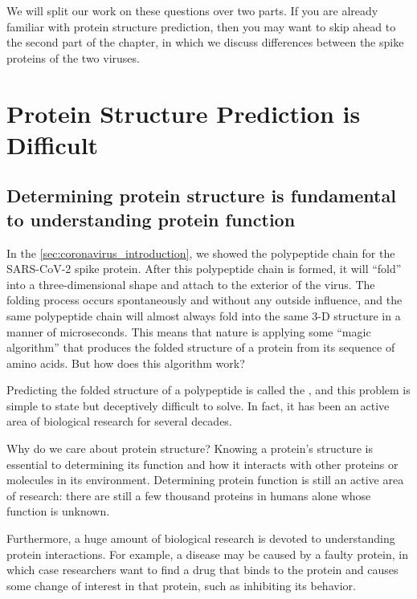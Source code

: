 We will split our work on these questions over two parts. If you are already familiar with protein structure prediction, then you may want to skip ahead to the second part of the chapter, in which we discuss differences between the spike proteins of the two viruses.

\FloatBarrier
{}

\section{Protein Structure Prediction is Difficult}
\label{sec:structure_intro}
\subsection{Determining protein structure is fundamental to understanding protein function}

In the \autoref{sec:coronavirus_introduction}, we showed the polypeptide chain for the SARS-CoV-2 spike protein. After this polypeptide chain is formed, it will ``fold'' into a three-dimensional shape and attach to the exterior of the virus. The folding process occurs spontaneously and without any outside influence, and the same polypeptide chain will almost always fold into the same 3-D structure in a manner of microseconds. This means that nature is applying some ``magic algorithm'' that produces the folded structure of a protein from its sequence of amino acids. But how does this algorithm work?

Predicting the folded structure of a polypeptide is called the , and this problem is simple to state but deceptively difficult to solve. In fact, it has been an active area of biological research for several decades.

Why do we care about protein structure? Knowing a protein's structure is essential to determining its function and how it interacts with other proteins or molecules in its environment. Determining protein function is still an active area of research: there are still a few thousand proteins in humans alone whose function is unknown.

Furthermore,  a huge amount of biological research is devoted to understanding protein interactions. For example, a disease may be caused by a faulty protein, in which case researchers want to find a drug that binds to the protein and causes some change of interest in that protein, such as inhibiting its behavior.

